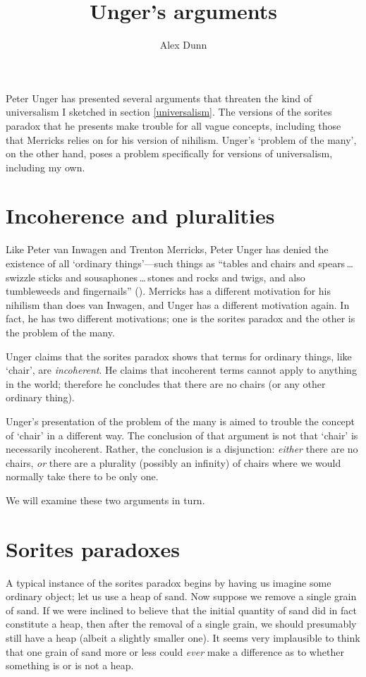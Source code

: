 \documentclass[11pt]{article}
\title{Unger's arguments}
\author{Alex Dunn}
\begin{document}
\ifstandalone
\maketitle
\begin{spacing}{1.5}
\fi

Peter Unger has presented several arguments that threaten the kind of
universalism I sketched in section \ref{universalism}.  The versions
of the sorites paradox that he presents make trouble for all vague
concepts, including those that Merricks relies on for his version of
nihilism.  Unger's `problem of the many', on the other hand, poses a
problem specifically for versions of universalism, including my own.

\section{Incoherence and pluralities}
\label{unger}
Like Peter van Inwagen and Trenton Merricks, Peter Unger has denied
the existence of all `ordinary things'---such things as ``tables and
chairs and spears\,\ldots swizzle sticks and
sousaphones\,\ldots\,stones and rocks and twigs, and also tumbleweeds
and fingernails'' (\citeyear[117]{unger1979}).  Merricks has a
different motivation for his nihilism than does van Inwagen, and Unger
has a different motivation again.  In fact, he has two different
motivations; one is the sorites paradox and the other is the problem
of the many.  

Unger claims that the sorites paradox shows that terms for ordinary
things, like `chair', are {\em incoherent}.  He claims that incoherent
terms cannot apply to anything in the world; therefore he concludes
that there are no chairs (or any other ordinary thing).

Unger's presentation of the problem of the many is aimed to trouble
the concept of `chair' in a different way.  The conclusion of that
argument is not that `chair' is necessarily incoherent.  Rather, the
conclusion is a disjunction: {\em either} there are no chairs, {\em
  or} there are a plurality (possibly an infinity) of chairs where we
would normally take there to be only one.

We will examine these two arguments in turn.

\section{Sorites paradoxes}
\label{sorites}
A typical instance of the sorites paradox begins by having us imagine
some ordinary object; let us use a heap of sand.  Now suppose we
remove a single grain of sand.  If we were inclined to believe that
the initial quantity of sand did in fact constitute a heap, then after
the removal of a single grain, we should presumably still have a heap
(albeit a slightly smaller one).  It seems very implausible to think
that one grain of sand more or less could {\em ever} make a difference
as to whether something is or is not a heap.


\end{spacing}
\end{document}
